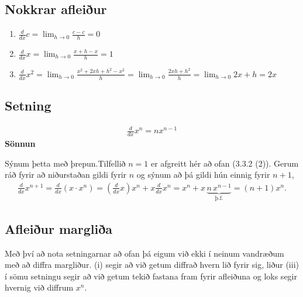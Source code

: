 \documentclass[a4paper,10pt,icelandic]{sphinxmanual}
\begin{document}
\subsection{Nokkrar afleiður}
\label{kafli03:setning-3-3-2}\label{kafli03:nokkrar-afleiur}\begin{enumerate}
\item {} 
\(\frac{d}{dx} c =  \lim_{h\to 0} \frac{c-c}h = 0\)

\item {} 
\(\frac{d}{dx} x =  \lim_{h\to 0} \frac{x+h-x}h = 1\)

\item {} 
\(\frac{d}{dx} x^2 = \lim_{h\to 0} \frac{x^2+2xh+h^2-x^2}h
= \lim_{h\to 0} \frac{2xh + h^2}h = \lim_{h\to 0} 2x+h= 2x\)

\end{enumerate}


\subsection{Setning}
\label{kafli03:id5}\label{kafli03:setning-3-3-3}\begin{equation*}
\begin{split}\frac{d}{dx} x^n = n x^{n-1}\end{split}
\end{equation*}
\textbf{Sönnun}

Sýnum þetta með þrepun.Tilfellið \(n=1\) er afgreitt hér að ofan
(3.3.2 (2)).
Gerum ráð fyrir að niðurstaðan gildi fyrir \(n\) og sýnum að þá
gildi hún einnig fyrir \(n+1\),
\begin{equation*}
\begin{split}\frac{d}{dx} x^{n+1} = \frac{d}{dx} (x\cdot x^n) =
    \left(\frac{d}{dx} x\right) x^n + x\frac{d}{dx} x^n
    = x^n + x\,
    \underbrace{n\, x^{n-1}}_\text{þ.f.}
    = (n+1) x^n.\end{split}
\end{equation*}

\subsection{Afleiður margliða}
\label{kafli03:afleiur-marglia}
Með því að nota setningarnar að ofan þá eigum við ekki í neinum
vandræðum með að diffra margliður. {\hyperref[kafli03:setning\string-3\string-3\string-1]{}} (i) segir
að við getum diffrað hvern lið fyrir sig, liður (iii) í sömu setningu
segir að við getum tekið fastana fram fyrir afleiðuna og loks segir
{\hyperref[kafli03:setning\string-3\string-3\string-3]{}} hvernig við diffrum \(x^n\).
\end{document}

